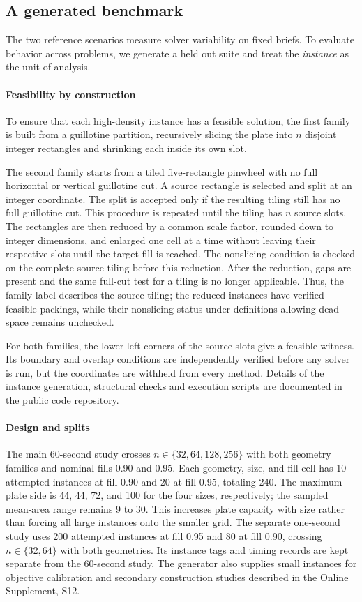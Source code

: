 \documentclass[preprint,12pt,authoryear,nonatbib]{elsarticle}
\begin{document}
\subsection{A generated benchmark}
\label{sec:bench}
The two reference scenarios measure solver variability on fixed briefs.
To evaluate behavior across problems, we generate a held out suite and treat the
\emph{instance} as the unit of analysis.

\paragraph{Feasibility by construction}
To ensure that each high-density instance has a feasible solution, the first
family is built from a guillotine partition, recursively slicing
the plate into $n$ disjoint integer rectangles and shrinking each inside its own
slot.

The second family starts from a tiled five-rectangle pinwheel with no full
horizontal or vertical guillotine cut. A source rectangle is selected and split
at an integer coordinate. The split is accepted only if the resulting tiling
still has no full guillotine cut. This procedure is repeated until the tiling has
$n$ source slots. The rectangles are then reduced by a common scale factor,
rounded down to integer dimensions, and enlarged one cell at a time without
leaving their respective slots until the target fill is reached. The nonslicing
condition is checked on the complete source tiling before this reduction. After
the reduction, gaps are present and the same full-cut test for a tiling is no
longer applicable. Thus, the family label describes the source tiling; the
reduced instances have verified feasible packings, while their nonslicing status
under definitions allowing dead space remains unchecked.

For both families, the lower-left corners of the source slots give a feasible
witness. Its boundary and overlap conditions are independently verified before
any solver is run, but the coordinates are withheld from every method.
Details of the instance generation, structural checks and execution scripts
are documented in the public code repository.

\paragraph{Design and splits}
The main 60-second study crosses $n\in\{32,64,128,256\}$ with both geometry
families and nominal fills 0.90 and 0.95. Each geometry, size, and fill cell
has 10 attempted instances at fill 0.90 and 20 at fill 0.95, totaling 240.
The maximum plate side is 44, 44, 72, and 100 for the four sizes, respectively;
the sampled mean-area range remains 9 to 30. This increases plate capacity
with size rather than forcing all large instances onto the smaller grid.
The separate one-second study uses 200 attempted instances at fill 0.95 and
80 at fill 0.90, crossing $n\in\{32,64\}$ with both geometries. Its instance
tags and timing records are kept separate from the 60-second study.
The generator also supplies small instances for objective calibration and
secondary construction studies described in the Online Supplement, S12.
\end{document}
